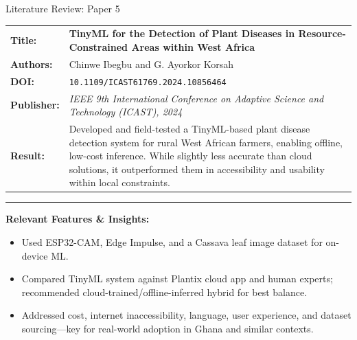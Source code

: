 \documentclass{beamer}
\begin{document}
\begin{frame} {Literature Review: Paper 5}

    \begin{tabularx} {\textwidth} {
            >{\bfseries}m{2.0cm}X
        }

        Title: & \textbf{TinyML for the Detection of Plant Diseases in Resource-Constrained Areas within West Africa}
        \\

        Authors: & Chinwe Ibegbu and G. Ayorkor Korsah
        \\

        DOI: & \texttt{10.1109/ICAST61769.2024.10856464}

        \\

        Publisher: & \textit{IEEE 9th International Conference on Adaptive Science and Technology (ICAST), 2024} \vfill
        \\

        Result: &

        Developed and field-tested a TinyML-based plant disease detection system for
        rural West African farmers, enabling offline, low-cost inference. While
        slightly less accurate than cloud solutions, it outperformed them in
        accessibility and usability within local constraints.

        \\

    \end{tabularx}

    {\color{leafColorSecondary} \rule{\textwidth}{0.75pt}}

    \textbf{Relevant Features \& Insights:}

    \begin{itemize}

        \item  Used ESP32-CAM, Edge Impulse, and a Cassava leaf image dataset for on-device ML.
        \item  Compared TinyML system against Plantix cloud app and human experts; recommended cloud-trained/offline-inferred hybrid for best balance.
        \item  Addressed cost, internet inaccessibility, language, user experience, and dataset sourcing—key for real-world adoption in Ghana and similar contexts.

    \end{itemize}

\end{frame}
\end{document}
